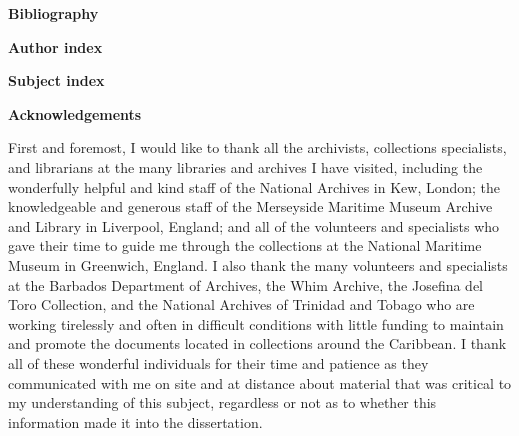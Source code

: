 \begin{styleStandard}
\textbf{Bibliography }
\end{styleStandard}


\begin{styleStandard}
\textbf{Author index}
\end{styleStandard}


\begin{styleStandard}
\textbf{Subject index}
\end{styleStandard}


\clearpage\begin{styleStandard}
\textbf{Acknowledgements}
\end{styleStandard}


\begin{styleStandard}
First and foremost, I would like to thank all the archivists, collections specialists, and librarians at the many libraries and archives I have visited, including the wonderfully helpful and kind staff of the National Archives in Kew, London; the knowledgeable and generous staff of the Merseyside Maritime Museum Archive and Library in Liverpool, England; and all of the volunteers and specialists who gave their time to guide me through the collections at the National Maritime Museum in Greenwich, England. I also thank the many volunteers and specialists at the Barbados Department of Archives, the Whim Archive, the Josefina del Toro Collection, and the National Archives of Trinidad and Tobago who are working tirelessly and often in difficult conditions with little funding to maintain and promote the documents located in collections around the Caribbean. I thank all of these wonderful individuals for their time and patience as they communicated with me on site and at distance about material that was critical to my understanding of this subject, regardless or not as to whether this information made it into the dissertation. 
\end{styleStandard}


